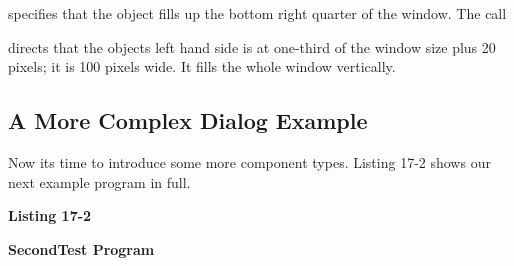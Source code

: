 
\noindent
specifies that the object fills up the bottom right quarter of the
window. The call


\noindent
directs that the object{\textquotesingle}s left hand side is at
one-third of the window size plus 20 pixels; it is 100 pixels wide. It
fills the whole window vertically.

\subsection{A More Complex Dialog Example}

Now it{\textquotesingle}s time to introduce some more component types.
Listing 17-2 shows our next example program in full.

\bigskip

{\sffamily\bfseries
Listing 17-2}

{\sffamily\bfseries
SecondTest Program}

